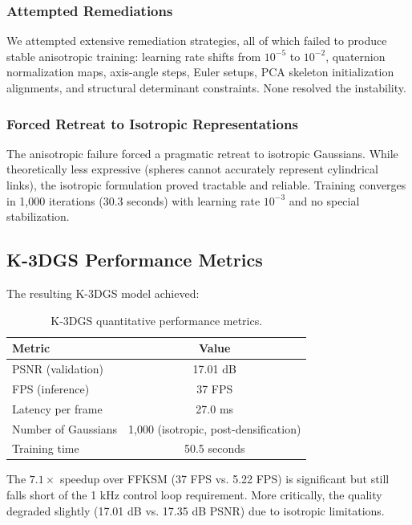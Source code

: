 \documentclass[12pt,a4paper,oneside]{report}
\begin{document}
\subsubsection{Attempted Remediations}

We attempted extensive remediation strategies, all of which failed to produce stable anisotropic training: learning rate shifts from $10^{-5}$ to $10^{-2}$, quaternion normalization maps, axis-angle steps, Euler setups, PCA skeleton initialization alignments, and structural determinant constraints. None resolved the instability.

\subsubsection{Forced Retreat to Isotropic Representations}

The anisotropic failure forced a pragmatic retreat to isotropic Gaussians. While theoretically less expressive (spheres cannot accurately represent cylindrical links), the isotropic formulation proved tractable and reliable. Training converges in 1,000 iterations (30.3 seconds) with learning rate $10^{-3}$ and no special stabilization.

\subsection{K-3DGS Performance Metrics}

The resulting K-3DGS model achieved:

\begin{table}[H]
\centering
\caption{K-3DGS quantitative performance metrics.}
\label{tab:k3dgs_performance}
\begin{tabular}{lc}
\toprule
Metric & Value \\
\midrule
PSNR (validation) & 17.01 dB \\
FPS (inference) & 37 FPS \\
Latency per frame & 27.0 ms \\
Number of Gaussians & 1,000 (isotropic, post-densification) \\
Training time & 50.5 seconds \\
\bottomrule
\end{tabular}
\end{table}

The $7.1\times$ speedup over FFKSM (37 FPS vs. 5.22 FPS) is significant but still falls short of the 1 kHz control loop requirement. More critically, the quality degraded slightly (17.01 dB vs. 17.35 dB PSNR) due to isotropic limitations.
\end{document}
